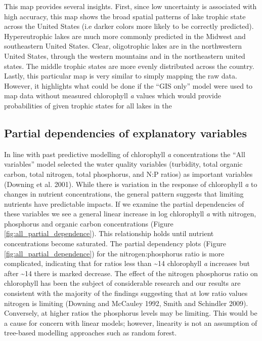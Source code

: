 \documentclass[12pt,]{article}
\begin{document}
This map provides several insights. First, since low uncertainty is
associated with high accuracy, this map shows the broad spatial patterns
of lake trophic state across the United States (i.e darker colors more
likely to be correctly predicted). Hypereutrophic lakes are much more
commonly predicted in the Midwest and southeastern United States. Clear,
oligotrophic lakes are in the northwestern United States, through the
western mountains and in the northeastern united states. The middle
trophic states are more evenly distributed across the country. Lastly,
this particular map is very similar to simply mapping the raw data.
However, it highlights what could be done if the ``GIS only'' model were
used to map data without measured chlorophyll \emph{a} values which
would provide probabilities of given trophic states for all lakes in the

\subsection{Partial dependencies of explanatory
variables}\label{partial-dependencies-of-explanatory-variables}

In line with past predictive modelling of chlorophyll \emph{a}
concentrations the ``All variables'' model selected the water quality
variables (turbidity, total organic carbon, total nitrogen, total
phosphorus, and N:P ratios) as important variables (Downing et al.
2001). While there is variation in the response of chlorophyll \emph{a}
to changes in nutrient concentrations, the general pattern suggests that
limiting nutrients have predictable impacts. If we examine the partial
dependencies of these variables we see a general linear increase in log
chlorophyll \emph{a} with nitrogen, phosphorus and organic carbon
concentrations (Figure \ref{fig:all_partial_dependence}). This
relationship holds until nutrient concentrations become saturated. The
partial dependency plots (Figure \ref{fig:all_partial_dependence}) for
the nitrogen:phosphorus ratio is more complicated, indicating that for
ratios less than \textasciitilde{}14 chlorophyll \emph{a} increases but
after \textasciitilde{}14 there is marked decrease. The effect of the
nitrogen phosphorus ratio on chlorophyll has been the subject of
considerable research and our results are consistent with the majority
of the findings suggesting that at low ratio values nitrogen is limiting
(Downing and McCauley 1992, Smith and Schindler 2009). Conversely, at
higher ratios the phosphorus levels may be limiting. This would be a
cause for concern with linear models; however, linearity is not an
assumption of tree-based modelling approaches such as random forest.
\end{document}
